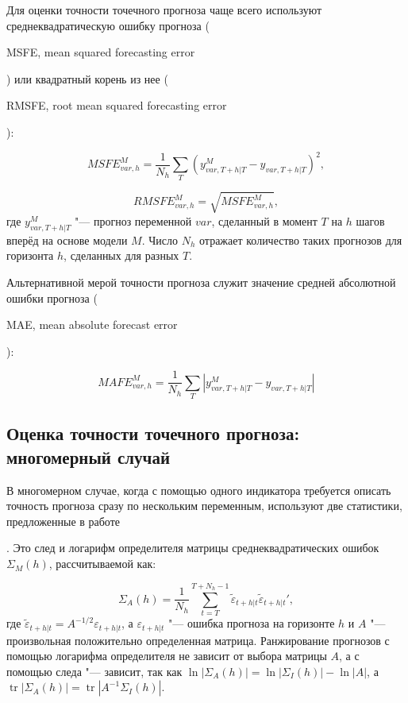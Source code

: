 \documentclass[11pt]{article} %
\DeclareMathOperator{\tr}{tr}
\newcommand{\eng}[1]{\begin{otherlanguage}{english}#1\end{otherlanguage}}
\begin{document}

Для оценки точности точечного прогноза чаще всего используют среднеквадратическую ошибку прогноза (\eng{MSFE, mean squared forecasting error}) или квадратный корень из нее (\eng{RMSFE, root mean squared forecasting error}):

\begin{equation}
MSFE_{var,h}^{M}=\frac{1}{N_h}\sum_{T} (y_{var,T+h|T}^{M}-y_{var,T+h|T})^2,
\end{equation}

\begin{equation}
RMSFE_{var,h}^{M}=\sqrt{MSFE_{var,h}^{M}},
\end{equation}
где $y_{var,T+h|T}^{M}$ "--- прогноз переменной $var$, сделанный в момент $T$ на $h$ шагов вперёд на основе модели $M$. Число $N_h$ отражает количество таких прогнозов для горизонта $h$, сделанных для разных $T$.


Альтернативной мерой точности прогноза служит значение средней абсолютной ошибки прогноза (\eng{MAE, mean absolute forecast error}): %


\begin{equation}
MAFE_{var,h}^{M}=\frac{1}{N_h}\sum_{T} |y_{var,T+h|T}^{M}-y_{var,T+h|T}|
\end{equation}


\subsection{Оценка точности точечного прогноза: многомерный случай}

В многомерном случае, когда с помощью одного индикатора требуется описать точность прогноза сразу по нескольким переменным, используют две статистики, предложенные в работе \eng{\cite{adolfson_al_2007}}.
Это след и логарифм определителя матрицы  среднеквадратических ошибок $\Sigma_M(h)$, рассчитываемой как:

\begin{equation}
\Sigma_A(h)=\frac{1}{N_h}\sum_{t=T}^{T+N_h-1} \tilde \varepsilon_{t+h|t}\tilde \varepsilon_{t+h|t}',
\end{equation}
где  $\tilde \varepsilon_{t+h|t}= A^{-1/2} \varepsilon_{t+h|t}$, а $\varepsilon_{t+h|t}$ "--- ошибка прогноза на горизонте $h$ и $A$ "--- произвольная положительно определенная матрица.
Ранжирование прогнозов с помощью логарифма определителя не зависит от выбора матрицы $A$, а с помощью следа "--- зависит, так как $\ln |\Sigma_A(h)| = \ln|\Sigma_I(h)|-\ln|A|$, а  $\tr|\Sigma_A(h)| = \tr|A^{-1}\Sigma_I(h)|$.
\end{document}
